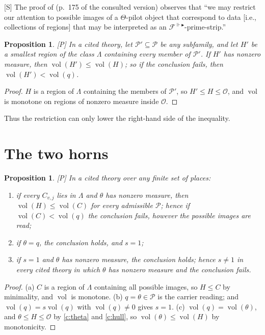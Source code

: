 \documentclass[11pt]{article}
\theoremstyle{plain}
\newtheorem{proposition}[theorem]{Proposition}
\theoremstyle{definition}
\theoremstyle{remark}
\newcommand{\Smark}{\textup{[S]}}
\newcommand{\Pmark}{\textup{[P]}}
\newcommand{\vol}{\operatorname{vol}}
\newcommand{\Poss}{\mathcal P}
\newcommand{\cO}{\mathcal O}
\begin{document}
\Smark{} The proof of \cite[Cor.~3.12]{IUT3} (p.~175 of the consulted version) observes that
``we may restrict our attention to possible images of a $\Theta$-pilot object that
correspond to data [i.e., collections of regions] that may be interpreted as an
$\mathcal F^{\Vdash\blacktriangleright}$-prime-strip.''

\begin{proposition}\label{p:restrict}
\Pmark{} In a cited theory, let $\Poss'\subseteq\Poss$ be any subfamily, and let $H'$ be a
smallest region of the class $\Lambda$ containing every member of $\Poss'$. If $H'$ has
nonzero measure, then $\vol(H')\le\vol(H)$; so if the conclusion fails, then
$\vol(H')<\vol(q)$.
\end{proposition}

\begin{proof}
$H$ is a region of $\Lambda$ containing the members of $\Poss'$, so $H'\le H\le\cO$, and
$\vol$ is monotone on regions of nonzero measure inside $\cO$.
\end{proof}

Thus the restriction can only lower the right-hand side of the inequality.

\section{The two horns}\label{s:horns}

\begin{proposition}\label{p:horns}
\Pmark{} In a cited theory over any finite set of places:
\begin{enumerate}[label=(\alph*)]
\item if every $C_{v,j}$ lies in $\Lambda$ and $\theta$ has nonzero measure, then
  $\vol(H)\le\vol(C)$ for \emph{every} admissible $\Poss$; hence if $\vol(C)<\vol(q)$
  the conclusion fails, however the possible images are read;
\item if $\theta=q$, the conclusion holds, and $s=1$;
\item if $s=1$ and $\theta$ has nonzero measure, the conclusion holds; hence $s\ne1$ in every
  cited theory in which $\theta$ has nonzero measure and the conclusion fails.
\end{enumerate}
\end{proposition}

\begin{proof}
(a) $C$ is a region of $\Lambda$ containing all possible images, so $H\le C$ by
minimality, and $\vol$ is monotone. (b) $q=\theta\in\Poss$ is the carrier reading; and
$\vol(q)=s\vol(q)$ with $\vol(q)\ne0$ gives $s=1$. (c) $\vol(q)=\vol(\theta)$, and
$\theta\le H\le\cO$ by \ref{c:theta} and \ref{c:hull}, so $\vol(\theta)\le\vol(H)$ by
monotonicity.
\end{proof}
\end{document}
